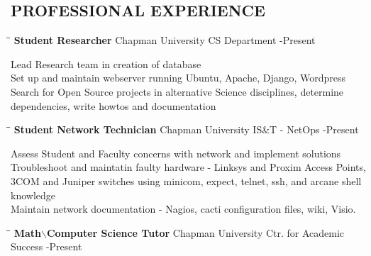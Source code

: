 \documentclass{res}
\begin{document}
\begin{resume}
\section{PROFESSIONAL EXPERIENCE}
   \vspace{-0.1in}	
   \begin{tabbing}
	\vspace{-12pt}
   \hspace{2.3in}\= \hspace{2.95in}\= \kill %
    {\bf Student Researcher} \>Chapman University CS Department     -Present\\
   \end{tabbing}\vspace{-20pt}      %
	 Lead Research team in creation of database\\
	 Set up and maintain webserver running Ubuntu, Apache, Django, Wordpress\\
	 Search for Open Source projects in alternative Science disciplines, determine dependencies, write howtos and documentation\\
	\vspace{-12pt}
   \begin{tabbing}
   \hspace{2.3in}\= \hspace{2.95in}\= \kill %
    {\bf Student Network Technician} \>Chapman University IS\&T - NetOps -Present\\
   \end{tabbing}\vspace{-20pt}
	 Assess Student and Faculty concerns with network and implement solutions\\
	 Troubleshoot and maintatin faulty hardware - Linksys and Proxim Access Points, 3COM and Juniper switches using minicom, expect, telnet, ssh, and arcane shell knowledge\\
	 Maintain network documentation - Nagios, cacti configuration files, wiki, Visio.\\
	\vspace{-12pt}
   \begin{tabbing}%
   \hspace{2.3in}\= \hspace{2.95in}\= \kill %
   {\bf Math$\backslash$Computer Science Tutor}  \>Chapman University Ctr. for Academic Success -Present\\
   \end{tabbing}\vspace{-20pt}

\end{resume}
\end{document}
